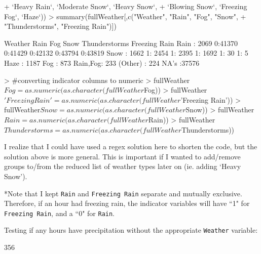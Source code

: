 \documentclass[11pt, a4paper]{article}
\begin{document}
\begin{Schunk}
\begin{Sinput}
+               `Heavy Rain`, `Moderate Snow`, `Heavy Snow`, 
+               `Blowing Snow`, `Freezing Fog`, `Haze`))
> summary(fullWeather[,c("Weather", "Rain", "Fog", "Snow", 
+                        "Thunderstorms", "Freezing Rain")])
\end{Sinput}
\begin{Soutput}
     Weather      Rain      Fog       Snow      Thunderstorms Freezing Rain
 Rain    : 2069   0:41370   0:41429   0:42132   0:43794       0:43819      
 Snow    : 1662   1: 2454   1: 2395   1: 1692   1:   30       1:    5      
 Haze    : 1187                                                            
 Fog     :  873                                                            
 Rain,Fog:  233                                                            
 (Other) :  224                                                            
 NA's    :37576                                                            
\end{Soutput}
\begin{Sinput}
> #converting indicator columns to numeric
> fullWeather$Fog = as.numeric(as.character(fullWeather$Fog))
> fullWeather$'Freezing Rain' = as.numeric(as.character(fullWeather$'Freezing Rain'))
> fullWeather$Snow = as.numeric(as.character(fullWeather$Snow))
> fullWeather$Rain = as.numeric(as.character(fullWeather$Rain))
> fullWeather$Thunderstorms = as.numeric(as.character(fullWeather$Thunderstorms))
\end{Sinput}
\end{Schunk}

I realize that I could have used a regex solution here to shorten the code, but the solution above is more general. This is important if I wanted to add/remove groups to/from the reduced list of weather types later on (ie. adding `Heavy Snow').
\par
*Note that I kept \texttt{Rain} and \texttt{Freezing Rain} separate and mutually exclusive. Therefore, if an hour had freezing rain, the indicator variables will have ``1" for \texttt{Freezing Rain}, and a ``0" for \texttt{Rain}.


\pagebreak

Testing if any hours have precipitation without the appropriate \texttt{Weather} variable:

\begin{Schunk}
\begin{Soutput}
[1] 356
\end{Soutput}
\end{Schunk}
\end{document}
